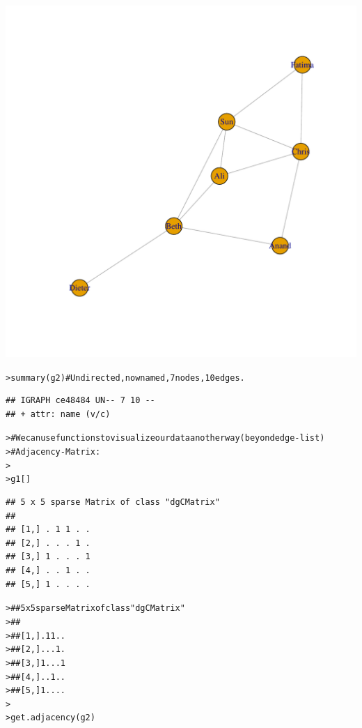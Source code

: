 \documentclass[12pt]{article}\usepackage[]{graphicx}\usepackage[]{color}
\makeatletter
\newcommand{\hlcom}[1]{\textcolor[rgb]{0.404,0.408,0.42}{#1}}%
\newcommand{\hlstd}[1]{\textcolor[rgb]{0.882,0.878,0.898}{#1}}%
\newcommand{\hlkwd}[1]{\textcolor[rgb]{0.733,0.388,0.812}{#1}}%
\newenvironment{kframe}{%
 \def\at@end@of@kframe{}%
 \ifinner\ifhmode%
  \def\at@end@of@kframe{\end{minipage}}%
  \begin{minipage}{\columnwidth}%
 \fi\fi%
 \def\FrameCommand##1{\hskip\@totalleftmargin \hskip-\fboxsep
 \colorbox{shadecolor}{##1}\hskip-\fboxsep
     \hskip-\linewidth \hskip-\@totalleftmargin \hskip\columnwidth}%
 \MakeFramed {\advance\hsize-\width
   \@totalleftmargin\z@ \linewidth\hsize
   \@setminipage}}%
 {\par\unskip\endMakeFramed%
 \at@end@of@kframe}
\newenvironment{knitrout}{}{} %
\makeatother
\begin{document}
\begin{flushleft}
\begin{center}
\begin{knitrout}
\includegraphics[width=6in]{figure/Network_Basics-2} 
\begin{kframe}\begin{alltt}
\hlstd{> }\hlkwd{summary}\hlstd{(g2)} \hlcom{# Undirected, now named, 7 nodes, 10 edges.}
\end{alltt}
\begin{verbatim}
## IGRAPH ce48484 UN-- 7 10 -- 
## + attr: name (v/c)
\end{verbatim}
\begin{alltt}
\hlstd{> }\hlcom{# We can use functions to visualize our data another way (beyond edge-list)}
\hlstd{> }\hlcom{# Adjacency-Matrix:}
\hlstd{> }
\hlstd{> }\hlstd{g1[]}
\end{alltt}
\begin{verbatim}
## 5 x 5 sparse Matrix of class "dgCMatrix"
##               
## [1,] . 1 1 . .
## [2,] . . . 1 .
## [3,] 1 . . . 1
## [4,] . . 1 . .
## [5,] 1 . . . .
\end{verbatim}
\begin{alltt}
\hlstd{> }\hlcom{## 5 x 5 sparse Matrix of class "dgCMatrix"}
\hlstd{> }\hlcom{##}
\hlstd{> }\hlcom{## [1,] . 1 1 . .}
\hlstd{> }\hlcom{## [2,] . . . 1 .}
\hlstd{> }\hlcom{## [3,] 1 . . . 1}
\hlstd{> }\hlcom{## [4,] . . 1 . .}
\hlstd{> }\hlcom{## [5,] 1 . . . .}
\hlstd{> }
\hlstd{> }\hlkwd{get.adjacency}\hlstd{(g2)}
\end{alltt}

\end{kframe}
\end{knitrout}
\end{center}
\end{flushleft}
\end{document}
